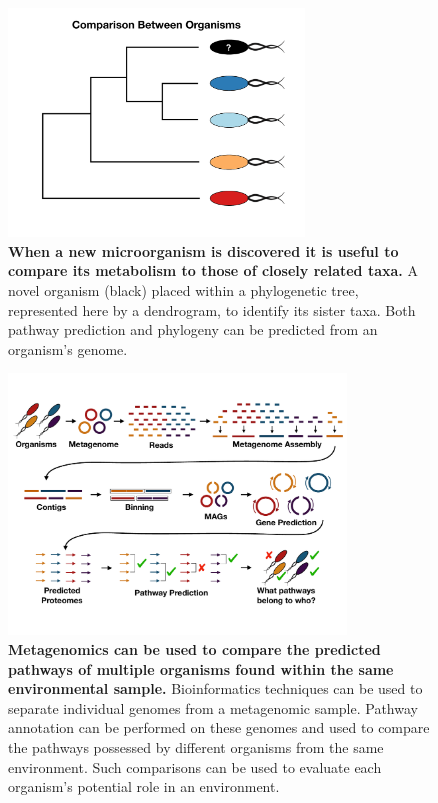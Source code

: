 \begin{figure}[!ht]
  \centering
	\includegraphics[width=0.7\textwidth]{media/compare-phylogenetically.pdf}
	 \caption[When a new microorganism is discovered it is useful to compare its metabolism to those of closely related taxa.]{\textbf{When a new microorganism is discovered it is useful to compare its metabolism to those of closely related taxa.} A novel organism (black) placed within a phylogenetic tree, represented here by a dendrogram, to identify its sister taxa. Both pathway prediction and phylogeny can be predicted from an organism's genome.}
	 \label{fig:phylogenetic-comparison}
\end{figure}

\begin{figure}[!ht]
  \centering
	\includegraphics[width=0.8\textwidth]{media/metagenomics.pdf}
	 \caption[Metagenomics can be used to compare the predicted pathways of multiple organisms found within the same environmental sample.]{\textbf{Metagenomics can be used to compare the predicted pathways of multiple organisms found within the same environmental sample.} Bioinformatics techniques can be used to separate individual genomes from a metagenomic sample. Pathway annotation can be performed on these genomes and used to compare the pathways possessed by different organisms from the same environment. Such comparisons can be used to evaluate each organism's potential role in an environment.}
	 \label{fig:metagenomics}
\end{figure}

